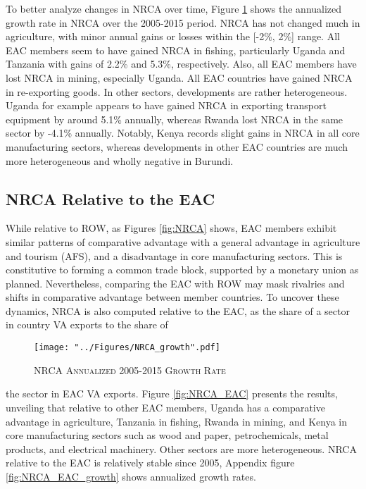 \documentclass[a4paper]{article}
\begin{document}
To better analyze changes in NRCA over time, Figure \ref{fig:NRCA_growth} shows the annualized growth rate in NRCA over the 2005-2015 period. NRCA has not changed much in agriculture, with minor annual gains or losses within the [-2\%, 2\%] range. All EAC members seem to have gained NRCA in fishing, particularly Uganda and Tanzania with gains of 2.2\% and 5.3\%, respectively. Also, all EAC members have lost NRCA in mining, especially Uganda. All EAC countries have gained NRCA in re-exporting goods. In other sectors, developments are rather heterogeneous. Uganda for example appears to have gained NRCA in exporting transport equipment by around 5.1\% annually, whereas Rwanda lost NRCA in the same sector by -4.1\% annually. Notably, Kenya records slight gains in NRCA in all core manufacturing sectors, whereas developments in other EAC countries are much more heterogeneous and wholly negative in Burundi.


\subsection{NRCA Relative to the EAC}

While relative to ROW, as Figures \ref{fig:NRCA} shows, EAC members exhibit similar patterns of comparative advantage with a general advantage in agriculture and tourism (AFS), and a disadvantage in core manufacturing sectors. This is constitutive to forming a common trade block, supported by a monetary union as planned. Nevertheless, comparing the EAC with ROW may mask rivalries and shifts in comparative advantage between member countries. To uncover these dynamics, NRCA is also computed relative to the EAC, as the share of a sector in country VA exports to the share of 

\begin{figure}[h!] \vspace{-5mm}
\centering
\caption{\label{fig:NRCA_growth}\textsc{NRCA Annualized 2005-2015 Growth Rate}}
\texttt{[image: "../Figures/NRCA\_growth".pdf]} %
\vspace{-5mm}
\end{figure}
\FloatBarrier

\noindent the sector in EAC VA exports. Figure \ref{fig:NRCA_EAC} presents the results, unveiling that relative to other EAC members, Uganda has a comparative advantage in agriculture, Tanzania in fishing, Rwanda in mining, and Kenya in core manufacturing sectors such as wood and paper, petrochemicals, metal products, and electrical machinery. %
Other sectors are more heterogeneous. NRCA relative to the EAC is relatively stable since 2005, Appendix figure \ref{fig:NRCA_EAC_growth} shows annualized growth rates. %
\end{document}
